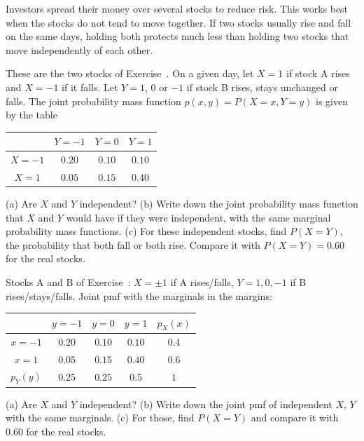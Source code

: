 
\begin{problem}
	\begin{context}
		Investors spread their money over several stocks to reduce risk. This
		works best when the stocks do not tend to move together. If two stocks
		usually rise and fall on the same days, holding both protects much less
		than holding two stocks that move independently of each other.
	\end{context}
	These are the two stocks of Exercise~. On a given day,
	let $X=1$ if stock A rises and $X=-1$ if it falls. Let $Y=1$, $0$ or $-1$
	if stock B rises, stays unchanged or falls. The joint probability mass
	function $p(x,y)=P(X=x,Y=y)$ is given by the table
	\begin{center}
		\renewcommand{\arraystretch}{1.2}
		\begin{tabular}{c|ccc}
			         & $Y=-1$ & $Y=0$  & $Y=1$  \\
			\hline
			$X=-1$   & $0.20$ & $0.10$ & $0.10$ \\
			$X=1$    & $0.05$ & $0.15$ & $0.40$
		\end{tabular}
	\end{center}
	(a) Are $X$ and $Y$ independent?
	(b) Write down the joint probability mass function that $X$ and $Y$ would
	have if they were independent, with the same marginal probability mass
	functions.
	(c) For these independent stocks, find $P(X=Y)$, the probability that both
	fall or both rise. Compare it with $P(X=Y)=0.60$ for the real stocks.
\end{problem}

\begin{slideproblem}
	Stocks A and B of Exercise~: $X=\pm1$ if A
	rises/falls, $Y=1,0,-1$ if B rises/stays/falls. Joint pmf with the
	marginals in the margins:
	\begin{center}
		\renewcommand{\arraystretch}{1.15}
		\begin{tabular}{c|ccc|c}
			       & $y=-1$ & $y=0$  & $y=1$  & $p_X(x)$ \\
			\hline
			$x=-1$ & $0.20$ & $0.10$ & $0.10$ & $0.4$ \\
			$x=1$  & $0.05$ & $0.15$ & $0.40$ & $0.6$ \\
			\hline
			$p_Y(y)$ & $0.25$ & $0.25$ & $0.5$ & $1$
		\end{tabular}
	\end{center}
	(a) Are $X$ and $Y$ independent?
	(b) Write down the joint pmf of independent $X$, $Y$ with the same
	marginals.
	(c) For those, find $P(X=Y)$ and compare it with $0.60$ for the real
	stocks.
\end{slideproblem}


